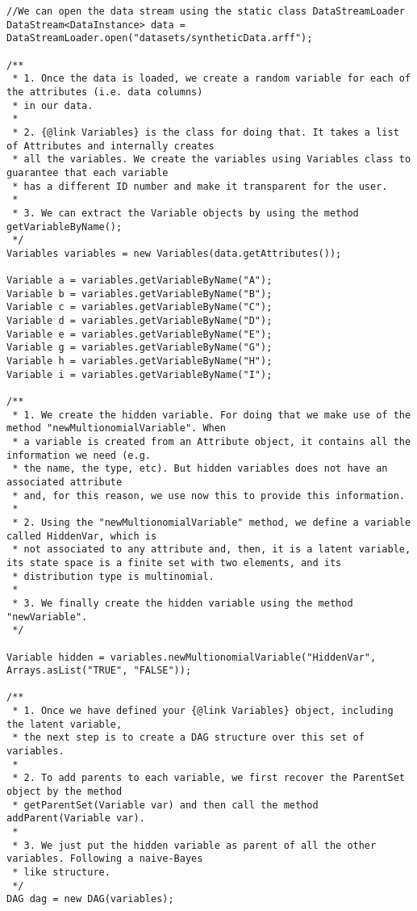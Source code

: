 \begin{lstlisting}
//We can open the data stream using the static class DataStreamLoader
DataStream<DataInstance> data = DataStreamLoader.open("datasets/syntheticData.arff");

/**
 * 1. Once the data is loaded, we create a random variable for each of the attributes (i.e. data columns)
 * in our data.
 *
 * 2. {@link Variables} is the class for doing that. It takes a list of Attributes and internally creates
 * all the variables. We create the variables using Variables class to guarantee that each variable
 * has a different ID number and make it transparent for the user.
 *
 * 3. We can extract the Variable objects by using the method getVariableByName();
 */
Variables variables = new Variables(data.getAttributes());

Variable a = variables.getVariableByName("A");
Variable b = variables.getVariableByName("B");
Variable c = variables.getVariableByName("C");
Variable d = variables.getVariableByName("D");
Variable e = variables.getVariableByName("E");
Variable g = variables.getVariableByName("G");
Variable h = variables.getVariableByName("H");
Variable i = variables.getVariableByName("I");

/**
 * 1. We create the hidden variable. For doing that we make use of the method "newMultionomialVariable". When
 * a variable is created from an Attribute object, it contains all the information we need (e.g.
 * the name, the type, etc). But hidden variables does not have an associated attribute
 * and, for this reason, we use now this to provide this information.
 *
 * 2. Using the "newMultionomialVariable" method, we define a variable called HiddenVar, which is
 * not associated to any attribute and, then, it is a latent variable, its state space is a finite set with two elements, and its
 * distribution type is multinomial.
 *
 * 3. We finally create the hidden variable using the method "newVariable".
 */

Variable hidden = variables.newMultionomialVariable("HiddenVar", Arrays.asList("TRUE", "FALSE"));

/**
 * 1. Once we have defined your {@link Variables} object, including the latent variable,
 * the next step is to create a DAG structure over this set of variables.
 *
 * 2. To add parents to each variable, we first recover the ParentSet object by the method
 * getParentSet(Variable var) and then call the method addParent(Variable var).
 *
 * 3. We just put the hidden variable as parent of all the other variables. Following a naive-Bayes
 * like structure.
 */
DAG dag = new DAG(variables);


\end{lstlisting}
